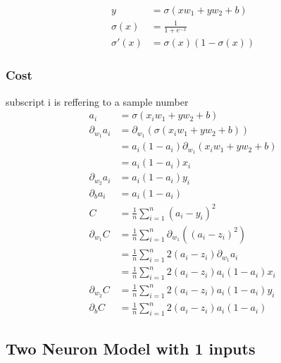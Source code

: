 \documentclass{article}
\begin{document}
\begin{align}
    y &= \sigma(xw_1 + yw_2 + b) \\
    \sigma(x) &= \frac{1}{1 + e^{-x}} \\
    \sigma'(x) &= \sigma(x)(1 - \sigma(x)) 
\end{align}

\newpage

\subsubsection{Cost}

\def\pd[#1]{\partial_{#1}}
\def\avgsum[#1,#2]{\frac{1}{#2}\sum_{#1=1}^{#2}}

subscript i is reffering to a sample number
\begin{align}
    a_i &= \sigma(x_iw_1 + yw_2 +b) \\
    \pd[w_1]a_i 
        &= \pd[w_1](\sigma(x_iw_1 + yw_2 + b)) \\
        &= a_i(1 - a_i)\pd[w_1](x_iw_1 + yw_2 + b) \\
        &= a_i(1 - a_i)x_i \\
    \pd[w_2]a_i
        &= a_i(1 - a_i)y_i \\
    \pd[b]a_i
        &= a_i(1 - a_i) \\
    C &= \avgsum[i,n](a_i - y_i)^2 \\
    \pd[w_1]C 
        &= \avgsum[i, n]\pd[w_1]\left((a_i - z_i)^2\right) \\
        &= \avgsum[i, n]2(a_i - z_i)\pd[w_1]a_i \\
        &= \avgsum[i, n]2(a_i - z_i)a_i(1 - a_i)x_i \\
    \pd[w_2]C
        &= \avgsum[i, n]2(a_i - z_i)a_i(1 - a_i)y_i \\
    \pd[b]C
        &= \avgsum[i, n]2(a_i - z_i)a_i(1 - a_i)
\end{align}

\pagebreak

\subsection{Two Neuron Model with 1 inputs}

\def\d{2.0}
\def\s[#1]{^{(#1)}}
\begin{center}
\end{center}
\end{document}
